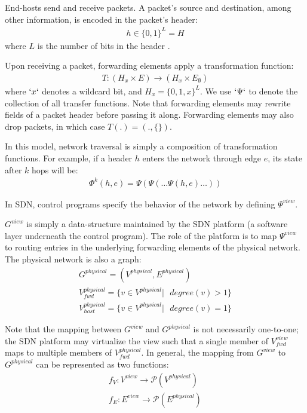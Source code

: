 \documentclass{sig-alternate-10pt}
\begin{document}
End-hosts send and receive packets. A packet's source and destination,
among other information, is encoded in the packet's header:
\begin{align*}
h \in \{0,1\}^L = H
\end{align*}
where $L$ is the number of bits in
the header \cite{HeaderSpace}.

Upon receiving a packet, forwarding elements apply a transformation function:
\begin{align*}
T: (H_x \times E) \rightarrow (H_x \times E_{\emptyset})
\end{align*}
where $`x`$ denotes a wildcard bit, and $H_x = \{0,1,x\}^L$. We use $`\Psi`$ to denote the collection of all transfer functions.
Note that forwarding elements may rewrite fields of a packet header before passing it along. Forwarding elements may also drop packets,
in which case $T(.) = (.,\{\})$.

In this model, network traversal is simply a composition of transformation
functions. For example, if a header $h$ enters the network through edge
$e$, its state after $k$ hops will be:
\begin{align*}
\Phi^k(h,e) = \Psi(\Psi(\dots \Psi(h,e)\dots))
\end{align*}

In SDN, control programs specify the behavior of the network by defining
$\Psi^{view}$.

$G^{view}$ is simply a data-structure maintained by the SDN platform
(a software layer underneath the control program). The role of the platform
is to map $\Psi^{view}$ to
routing entries in the underlying forwarding elements of the
physical network. The physical network is also a graph:
\begin{align*}
G^{physical} = (V^{physical}, E^{physical}) \\
V_{fwd}^{physical} =  \{ v \in V^{physical} |\text{ } degree(v) > 1 \} \\
V_{host}^{physical} =  \{ v \in V^{physical} |\text{ } degree(v) = 1 \}
\end{align*}

Note that the mapping between $G^{view}$ and $G^{physical}$ is not
necessarily one-to-one; the SDN platform may virtualize the view
such that a single member of $V_{fwd}^{view}$ maps to multiple members of
$V_{fwd}^{physical}$. In general, the mapping from $G^{view}$ to
$G^{physical}$ can be represented as two functions:
\begin{align*}
f_{V} : V^{view} \rightarrow \mathcal{P}(V^{physical}) \\
f_{E} : E^{view} \rightarrow \mathcal{P}(E^{physical})
\end{align*}
\end{document}

